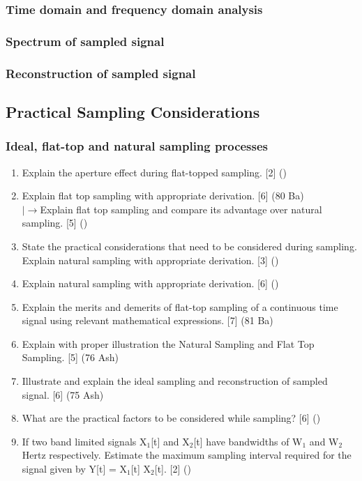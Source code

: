 \documentclass[12pt]{article}
\newcommand{\lb}{\\$\left|\rightarrow\right.$}
\begin{document}
    \subsubsection{Time domain and frequency domain analysis}
    \subsubsection{Spectrum of sampled signal}
    \subsubsection{Reconstruction of sampled signal}
  \subsection{Practical Sampling Considerations}
    \subsubsection{Ideal, flat-top and natural sampling processes}
      \begin{enumerate}
        \item Explain the aperture effect during flat-topped sampling. \hfill [2] ()
        
        \item Explain flat top sampling with appropriate derivation. \hfill [6] (80 Ba)
        \lb Explain flat top sampling and compare its advantage over natural sampling. \hfill [5] ()
        
        \item State the practical considerations that need to be considered during sampling. Explain natural sampling with appropriate derivation. \hfill [3] ()
        
        \item Explain natural sampling with appropriate derivation. \hfill [6] ()
        
        \item Explain the merits and demerits of flat-top sampling of a continuous time signal using relevant mathematical expressions. \hfill [7] (81 Ba)
        
        \item Explain with proper illustration the Natural Sampling and Flat Top Sampling. \hfill [5] (76 Ash)
        
        \item Illustrate and explain the ideal sampling and reconstruction of sampled signal. \hfill [6] (75 Ash)
        
        \item What are the practical factors to be considered while sampling? \hfill [6] ()
        
        \item If two band limited signals X$_1$[t] and X$_2$[t] have bandwidths of W$_1$ and W$_2$ Hertz respectively. Estimate the maximum sampling interval required for the signal given by Y[t] = X$_1$[t] X$_2$[t]. \hfill [2] ()
      \end{enumerate}
\end{document}

